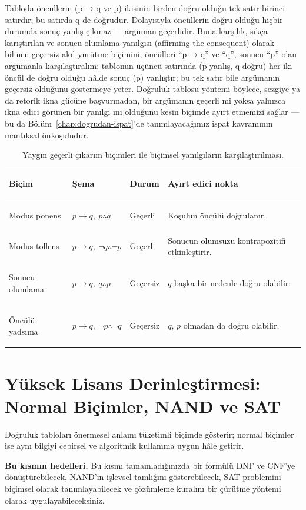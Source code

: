 Tabloda öncüllerin (p → q ve p) ikisinin birden doğru olduğu tek satır birinci satırdır; bu satırda q de doğrudur. Dolayısıyla öncüllerin doğru olduğu hiçbir durumda sonuç yanlış çıkmaz — argüman geçerlidir. Buna karşılık, sıkça karıştırılan ve sonucu olumlama yanılgısı (affirming the consequent) olarak bilinen geçersiz akıl yürütme biçimini, öncülleri “p → q” ve “q”, sonucu “p” olan argümanla karşılaştıralım: tablonun üçüncü satırında (p yanlış, q doğru) her iki öncül de doğru olduğu hâlde sonuç (p) yanlıştır; bu tek satır bile argümanın geçersiz olduğunu göstermeye yeter. Doğruluk tablosu yöntemi böylece, sezgiye ya da retorik ikna gücüne başvurmadan, bir argümanın geçerli mi yoksa yalnızca ikna edici görünen bir yanılgı mı olduğunu kesin biçimde ayırt etmemizi sağlar — bu da Bölüm~\ref{chap:dogrudan-ispat}’de tanımlayacağımız ispat kavramının mantıksal önkoşuludur.

\begin{table}[htbp]
\centering
\small
\renewcommand{\arraystretch}{1.18}
\begin{tabularx}{\linewidth}{>{\bfseries\raggedright\arraybackslash}p{2.3cm}p{3.3cm}p{2.1cm}Y}
\toprule
Biçim & Şema & Durum & Ayırt edici nokta \\
\midrule
Modus ponens & $p\to q,\ p\therefore q$ & Geçerli & Koşulun öncülü doğrulanır. \\
Modus tollens & $p\to q,\ \neg q\therefore\neg p$ & Geçerli & Sonucun olumsuzu kontrapozitifi etkinleştirir. \\
Sonucu olumlama & $p\to q,\ q\therefore p$ & Geçersiz & $q$ başka bir nedenle doğru olabilir. \\
Öncülü yadsıma & $p\to q,\ \neg p\therefore\neg q$ & Geçersiz & $q$, $p$ olmadan da doğru olabilir. \\
\bottomrule
\end{tabularx}
\caption{Yaygın geçerli çıkarım biçimleri ile biçimsel yanılgıların karşılaştırılması.}
\end{table}

\section{Yüksek Lisans Derinleştirmesi: Normal Biçimler, NAND ve SAT}

Doğruluk tabloları önermesel anlamı tüketimli biçimde gösterir; normal biçimler ise aynı bilgiyi cebirsel ve algoritmik kullanıma uygun hâle getirir.

\textbf{Bu kısmın hedefleri.} Bu kısmı tamamladığınızda bir formülü DNF ve CNF’ye dönüştürebilecek, NAND’ın işlevsel tamlığını gösterebilecek, SAT problemini biçimsel olarak tanımlayabilecek ve çözümleme kuralını bir çürütme yöntemi olarak uygulayabileceksiniz.



